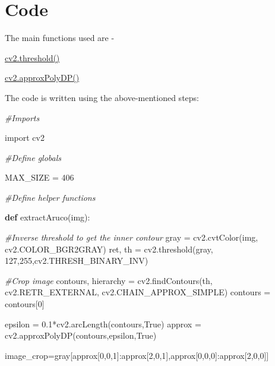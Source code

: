 \documentclass[]{article}
\newenvironment{Shaded}{}{}
\newcommand{\KeywordTok}[1]{\textcolor[rgb]{0.00,0.44,0.13}{\textbf{{#1}}}}
\newcommand{\DecValTok}[1]{\textcolor[rgb]{0.25,0.63,0.44}{{#1}}}
\newcommand{\FloatTok}[1]{\textcolor[rgb]{0.25,0.63,0.44}{{#1}}}
\newcommand{\ImportTok}[1]{{#1}}
\newcommand{\CommentTok}[1]{\textcolor[rgb]{0.38,0.63,0.69}{\textit{{#1}}}}
\newcommand{\VariableTok}[1]{\textcolor[rgb]{0.10,0.09,0.49}{{#1}}}
\newcommand{\OperatorTok}[1]{\textcolor[rgb]{0.40,0.40,0.40}{{#1}}}
\newcommand{\NormalTok}[1]{{#1}}
\begin{document}
\section{Code}\label{code}

The main functions used are -

\href{https://github.com/eyantrainternship/eYSIP_2015_Marker_based_Robot_Localisation/wiki/Thresholding}{cv2.threshold()}

\href{https://github.com/eyantrainternship/eYSIP_2015_Marker_based_Robot_Localisation/wiki/Contour-Features-and-Shape-Detection}{cv2.approxPolyDP()}

The code is written using the above-mentioned steps:

\begin{Shaded}
\begin{Highlighting}[]
\CommentTok{#Imports}

\ImportTok{import} \NormalTok{cv2}

\CommentTok{#Define globals}

\NormalTok{MAX_SIZE }\OperatorTok{=} \DecValTok{406}

\CommentTok{#Define helper functions}

\KeywordTok{def} \NormalTok{extractAruco(img):}
    
    \CommentTok{#Inverse threshold to get the inner contour}
    \NormalTok{gray }\OperatorTok{=} \NormalTok{cv2.cvtColor(img, cv2.COLOR_BGR2GRAY)}
    \NormalTok{ret, th }\OperatorTok{=} \NormalTok{cv2.threshold(gray, }\DecValTok{127}\NormalTok{,}\DecValTok{255}\NormalTok{,cv2.THRESH_BINARY_INV)}

    \CommentTok{#Crop image}
    \NormalTok{contours, hierarchy }\OperatorTok{=} \NormalTok{cv2.findContours(th, cv2.RETR_EXTERNAL,}
                                           \NormalTok{cv2.CHAIN_APPROX_SIMPLE)}
    \NormalTok{contours }\OperatorTok{=} \NormalTok{contours[}\DecValTok{0}\NormalTok{]}

    \NormalTok{epsilon }\OperatorTok{=} \FloatTok{0.1}\OperatorTok{*}\NormalTok{cv2.arcLength(contours,}\VariableTok{True}\NormalTok{)}
    \NormalTok{approx }\OperatorTok{=} \NormalTok{cv2.approxPolyDP(contours,epsilon,}\VariableTok{True}\NormalTok{)}

    \NormalTok{image_crop}\OperatorTok{=}\NormalTok{gray[approx[}\DecValTok{0}\NormalTok{,}\DecValTok{0}\NormalTok{,}\DecValTok{1}\NormalTok{]:approx[}\DecValTok{2}\NormalTok{,}\DecValTok{0}\NormalTok{,}\DecValTok{1}\NormalTok{],approx[}\DecValTok{0}\NormalTok{,}\DecValTok{0}\NormalTok{,}\DecValTok{0}\NormalTok{]:approx[}\DecValTok{2}\NormalTok{,}\DecValTok{0}\NormalTok{,}\DecValTok{0}\NormalTok{]]}


\end{Highlighting}
\end{Shaded}
\end{document}
